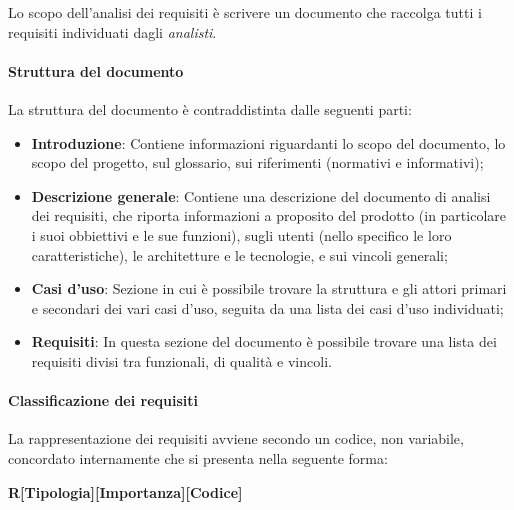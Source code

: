 \documentclass[../norme_di_progetto.tex]{subfiles}
\begin{document}
Lo scopo dell'analisi dei requisiti è scrivere un documento che raccolga tutti i requisiti individuati dagli \emph{analisti}.

\paragraph{Struttura del documento}

La struttura del documento è contraddistinta dalle seguenti parti:
\begin{itemize}
    \item \textbf{Introduzione}: Contiene informazioni riguardanti lo scopo del documento, lo scopo del progetto, sul glossario, sui riferimenti (normativi e informativi);
    \item \textbf{Descrizione generale}: Contiene una descrizione del documento di analisi dei requisiti, che riporta informazioni a proposito del prodotto (in particolare i suoi obbiettivi e le sue funzioni), sugli utenti (nello specifico le loro caratteristiche), le architetture e le tecnologie, e sui vincoli generali;
    \item \textbf{Casi d'uso}: Sezione in cui è possibile trovare la struttura e gli attori primari e secondari dei vari casi d'uso, seguita da una lista dei casi d'uso individuati;
    \item \textbf{Requisiti}: In questa sezione del documento è possibile trovare una lista dei requisiti divisi tra funzionali, di qualità e vincoli.
\end{itemize}

\paragraph{Classificazione dei requisiti}
La rappresentazione dei requisiti avviene secondo un codice, non variabile, concordato internamente che si presenta nella seguente forma:\\
\begin{center}
    \textbf{R[Tipologia][Importanza][Codice]}
\end{center}
\end{document}
